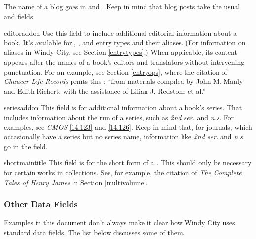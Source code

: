 \documentclass[11pt,letterpaper,oneside]{article}
\begin{document}
\begin{marglist}

\item[\smash{\tshortstack[l]{blogtitle\\blogsubtitle}}] The name of a
blog goes in  and . Keep in
mind that blog posts take the usual  and
 fields.

\item[editoraddon] Use this field to include additional editorial
information about a book. It's available for ,
, and  entry types and their
aliases. (For information on aliases in Windy City, see Section
\ref{entrytypes}.) When applicable, its content appears after the
names of a book's editors and translators without intervening
punctuation. For an example, see Section \ref{entryops}, where the
citation of \textit{Chaucer Life-Records} prints this
: ``from materials compiled by John M. Manly and
Edith Richert, with the assistance of Lilian J. Redstone et al.''

\item[seriesaddon] This field is for additional information about a
book's series. That includes information about the run of a series,
such as \textit{2nd ser.} and \textit{n.s.} For examples, see
\textit{CMOS} \ref{14.123} and \ref{14.126}. Keep in mind that, for
journals, which occasionally have a series but no series name,
information like \textit{2nd ser.} and \textit{n.s.} go in the
 field.

\item[shortmaintitle] This field is for the short form of a
. This should only be necessary for certain works
in collections. See, for example, the citation of \textit{The Complete
Tales of Henry James} in Section \ref{multivolume}.

\end{marglist}

\subsubsection{Other Data Fields}
\label{fieldscon}

Examples in this document don't always make it clear how Windy City
uses standard data fields. The list below discusses some of them.
\end{document}
